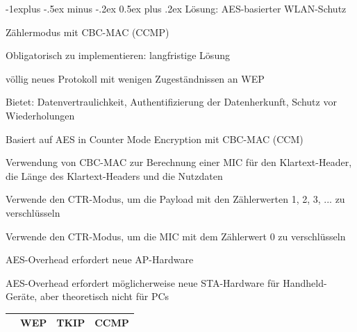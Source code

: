 \documentclass[a4paper]{article}
\makeatletter
\renewcommand{\subsection}{\@startsection{subsection}{2}{0mm}%
 {-1explus -.5ex minus -.2ex}%
 {0.5ex plus .2ex}%
 {\normalfont\normalsize\bfseries}}
\makeatother
\begin{document}
\begin{multicols}{3}


      \subsection{Lösung: AES-basierter WLAN-Schutz}
      \begin{itemize*}
            \item Zählermodus mit CBC-MAC (CCMP)
            \item Obligatorisch zu implementieren: langfristige Lösung
            \item völlig neues Protokoll mit wenigen Zugeständnissen an WEP
            \item Bietet: Datenvertraulichkeit, Authentifizierung der Datenherkunft, Schutz vor Wiederholungen
            \item Basiert auf AES in Counter Mode Encryption mit CBC-MAC (CCM)
            \begin{itemize*}
                  \item Verwendung von CBC-MAC zur Berechnung einer MIC für den Klartext-Header, die Länge des Klartext-Headers und die Nutzdaten
                  \item Verwende den CTR-Modus, um die Payload mit den Zählerwerten 1, 2, 3, ... zu verschlüsseln
                  \item Verwende den CTR-Modus, um die MIC mit dem Zählerwert 0 zu verschlüsseln
            \end{itemize*}
            \item AES-Overhead erfordert neue AP-Hardware
            \item AES-Overhead erfordert möglicherweise neue STA-Hardware für Handheld-Geräte, aber theoretisch nicht für PCs %
      \end{itemize*}
      \begin{tabular}{c|c|c|c}
                       & WEP             & TKIP        & CCMP                           \\\hline

\end{tabular}
\end{multicols}
\end{document}
